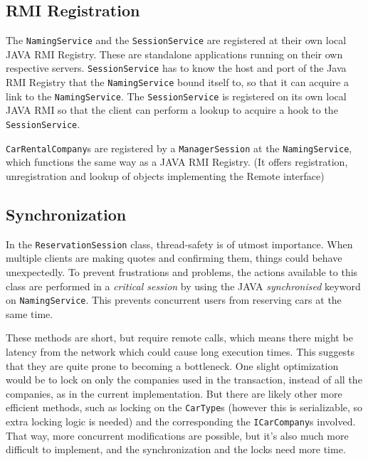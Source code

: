 \documentclass[a4paper]{article}
\begin{document}
\subsection{RMI Registration}
The \texttt{NamingService} and the \texttt{SessionService} are registered at their own local JAVA RMI Registry. These are standalone applications running on their own respective servers. \texttt{SessionService} has to know the host and port of the Java RMI Registry that the \texttt{NamingService} bound itself to, so that it can acquire a link to the \texttt{NamingService}. The \texttt{SessionService} is registered on its own local JAVA RMI so that the client can perform a lookup to acquire a hook to the \texttt{SessionService}.

\texttt{CarRentalCompany}s are registered by a \texttt{ManagerSession} at the \texttt{NamingService}, which functions the same way as a JAVA RMI Registry. (It offers registration, unregistration and lookup of objects implementing the Remote interface)

\subsection{Synchronization}
In the \texttt{ReservationSession} class, thread-safety is of utmost importance. When multiple clients are making quotes and confirming them, things could behave unexpectedly. To prevent frustrations and problems, the actions available to this class are performed in a \emph{critical session} by using the JAVA \emph{synchronised} keyword on \texttt{NamingService}. This prevents concurrent users from reserving cars at the same time.

These methods are short, but require remote calls, which means there might be latency from the network which could cause long execution times. This suggests that they are quite prone to becoming a bottleneck. One slight optimization would be to lock on only the companies used in the transaction, instead of all the companies, as in the current implementation. But there are likely other more efficient methods, such as locking on the \texttt{CarType}s (however this is serializable, so extra locking logic is needed) and the corresponding the \texttt{ICarCompany}s involved. That way, more concurrent modifications are possible, but it's also much more difficult to implement, and the synchronization and the locks need more time.
\end{document}
